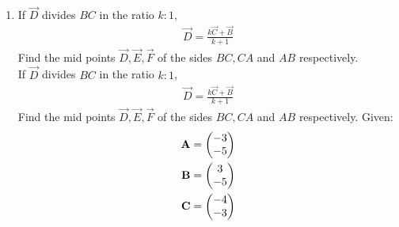 \documentclass[11pt]{book}
\begin{document}
\begin{enumerate}[label=\thesection.\arabic*.,ref=\thesection.\theenumi]

\item  If $\vec{D}$ divides $BC$ in the ratio $k : 1$,
		\begin{align}
			\vec{D}= \frac{k\vec{C}+\vec{B}}{k+1}
		\end{align}
Find the mid points $\vec{D}, \vec{E}, \vec{F}$ of the sides $BC, CA$ and $AB$ respectively.\\
If $\vec{D}$ divides $BC$ in the ratio $k : 1$,
\begin{align}
\vec{D}= \frac{k\vec{C}+\vec{B}}{k+1}
\end{align}
Find the mid points $\vec{D}, \vec{E}, \vec{F}$ of the sides $BC, CA$ and $AB$ respectively.
\newline
Given:
\begin{align}
\mathbf{A} &= \begin{pmatrix}-3\\-5\\\end{pmatrix}\\
\mathbf{B} &= \begin{pmatrix}3\\-5\\\end{pmatrix}\\
\mathbf{C} &= \begin{pmatrix}-4\\-3\\\end{pmatrix}
\end{align}


\end{enumerate}
\end{document}
